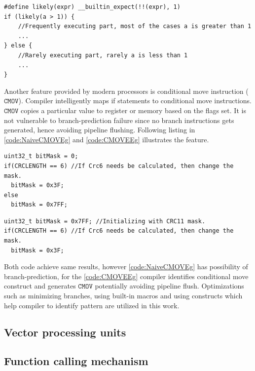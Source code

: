 \begin{verbatim}
#define likely(expr) __builtin_expect(!!(expr), 1)
if (likely(a > 1)) {
	//Frequently executing part, most of the cases a is greater than 1
	...
} else {
	//Rarely executing part, rarely a is less than 1
	...
}
\end{verbatim}

Another feature provided by modern processors is conditional move instruction ($\mathtt{CMOV}$). Compiler intelligently maps if statements to conditional move instructions. $\mathtt{CMOV}$ copies a particular value to register or memory based on the flags set. It is not vulnerable to branch-prediction failure since no branch instructions gets generated, hence avoiding pipeline flushing. Following listing in \ref{code:NaiveCMOVEg} and \ref{code:CMOVEEg} illustrates the feature.

\begin{code}
	\label{code:NaiveCMOVEg}
\begin{verbatim}
uint32_t bitMask = 0;
if(CRCLENGTH == 6) //If Crc6 needs be calculated, then change the mask.
  bitMask = 0x3F;
else
  bitMask = 0x7FF;
\end{verbatim}
\end{code}

\begin{code}
	\label{code:CMOVEEg}
\begin{verbatim}
uint32_t bitMask = 0x7FF; //Initializing with CRC11 mask.
if(CRCLENGTH == 6) //If Crc6 needs be calculated, then change the mask.
  bitMask = 0x3F;
\end{verbatim}
\end{code}

Both code achieve same results, however \ref{code:NaiveCMOVEg} has possibility of branch-prediction, for the \ref{code:CMOVEEg} compiler identifies conditional move construct and generates $\mathtt{CMOV}$ potentially avoiding pipeline flush. Optimizations such as minimizing branches, using built-in macros and using constructs which help compiler to identify pattern are utilized in this work.

\subsection{Vector processing units}


\subsection{Function calling mechanism}



